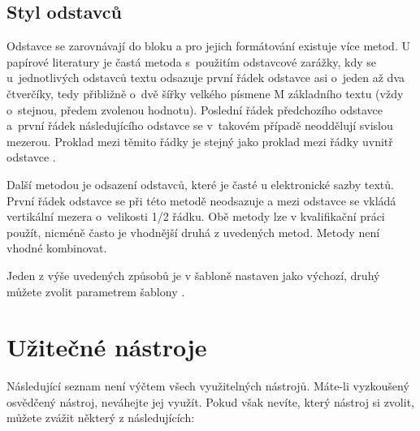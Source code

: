 \subsection*{Styl odstavců}

Odstavce se zarovnávají do bloku a pro jejich formátování existuje více metod. U papírové literatury je častá metoda s~použitím odstavcové zarážky, kdy se u~jednotlivých odstavců textu odsazuje první řádek odstavce asi o~jeden až dva čtverčíky, tedy přibližně o~dvě šířky velkého písmene M základního textu (vždy o~stejnou, předem zvolenou hodnotu). Poslední řádek předchozího odstavce a~první řádek následujícího odstavce se v~takovém případě neoddělují svislou mezerou. Proklad mezi těmito řádky je stejný jako proklad mezi řádky uvnitř odstavce \cite{fitWeb}.

Další metodou je odsazení odstavců, které je časté u elektronické sazby textů. První řádek odstavce se při této metodě neodsazuje a mezi odstavce se vkládá vertikální mezera o~velikosti 1/2 řádku. Obě metody lze v kvalifikační práci použít, nicméně často je vhodnější druhá z uvedených metod. Metody není vhodné kombinovat.

Jeden z výše uvedených způsobů je v šabloně nastaven jako výchozí, druhý můžete zvolit parametrem šablony .

\section{Užitečné nástroje}
\label{nastroje}

Následující seznam není výčtem všech využitelných nástrojů. Máte-li vyzkoušený osvědčený nástroj, neváhejte jej využít. Pokud však nevíte, který nástroj si zvolit, můžete zvážit některý z následujících:

